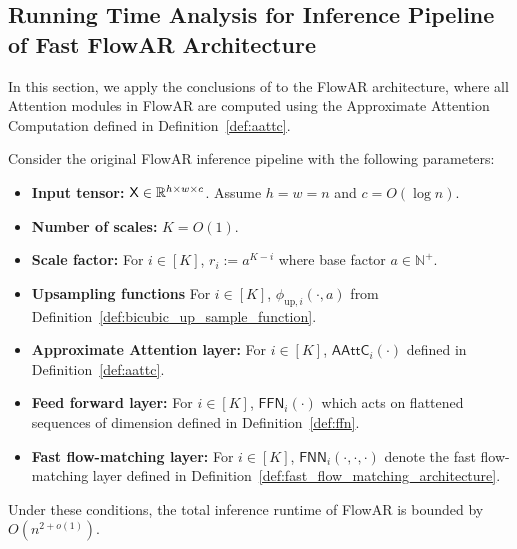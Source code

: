 \subsection{Running Time Analysis for Inference Pipeline of Fast FlowAR Architecture }\label{sec:runtime_fast_flowar}
In this section, we apply the conclusions of \cite{as23} to the FlowAR architecture, where all Attention modules in FlowAR are computed using the Approximate Attention Computation defined in Definition~\ref{def:aattc}.
\begin{lemma}\label{lem:runtime_fast_flowar_formal}
    Consider the original FlowAR inference pipeline with the following parameters:
    \begin{itemize}
        \item {\bf Input tensor:} $\mathsf{X} \in \mathbb{R}^{h \times w \times c}$. Assume $h=w=n$ and $c = O(\log n)$.
        \item {\bf Number of scales:} $K = O(1)$.
        \item {\bf Scale factor:} For $i \in [K]$, $r_i:= a^{K-i}$ where base factor $a \in \mathbb{N}^+$.
        \item {\bf Upsampling functions}  For $i \in [K]$, $\phi_{\mathrm{up},i}(\cdot,a)$ from Definition~\ref{def:bicubic_up_sample_function}.
        \item {\bf Approximate Attention layer:}  For $i \in [K]$, $\mathsf{AAttC}_i(\cdot)$ defined in Definition~\ref{def:aattc}.
        \item {\bf Feed forward layer: } For $i \in [K]$, $\mathsf{FFN}_i(\cdot)$ which acts on flattened sequences of dimension defined in Definition~\ref{def:ffn}.
        \item {\bf Fast flow-matching layer:} For $i \in [K]$, $\mathsf{FNN}_i(\cdot,\cdot,\cdot)$ denote the fast flow-matching layer defined in Definition~\ref{def:fast_flow_matching_architecture}.
    \end{itemize}
    Under these conditions, the total inference runtime of FlowAR is bounded by $O(n^{2+o(1)})$.
      
\end{lemma}
